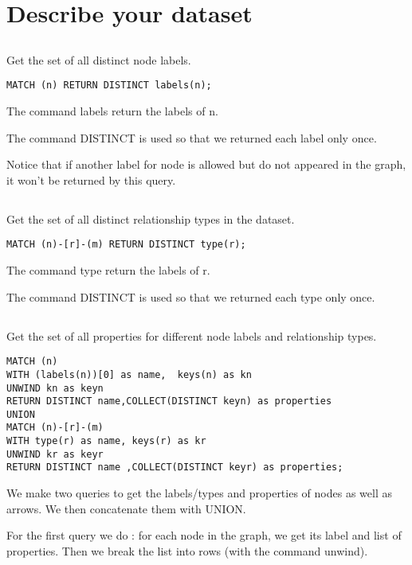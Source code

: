\section{Describe your dataset}
\subsection{}
Get the set of all distinct node labels.

\begin{verbatim}
MATCH (n) RETURN DISTINCT labels(n);
\end{verbatim}

The command labels return the labels of n.

The command DISTINCT is used so that we returned each label only once.

Notice that if another label for node is allowed but do not appeared in the graph, it won't be returned by this query.

\subsection{}
Get the set of all distinct relationship types in the dataset.

\begin{verbatim}
MATCH (n)-[r]-(m) RETURN DISTINCT type(r);
\end{verbatim}

The command type return the labels of r.

The command DISTINCT is used so that we returned each type only once.

\subsection{}
Get the set of all properties for different node labels and relationship types.

\begin{verbatim}
MATCH (n)
WITH (labels(n))[0] as name,  keys(n) as kn
UNWIND kn as keyn
RETURN DISTINCT name,COLLECT(DISTINCT keyn) as properties
UNION
MATCH (n)-[r]-(m)
WITH type(r) as name, keys(r) as kr
UNWIND kr as keyr
RETURN DISTINCT name ,COLLECT(DISTINCT keyr) as properties;
\end{verbatim}

We make two queries to get the labels/types and properties of nodes as well as arrows. We then concatenate them with UNION.

For the first query we do : for each node in the graph, we get its label and list of properties. Then we break the list into rows (with the command unwind).

